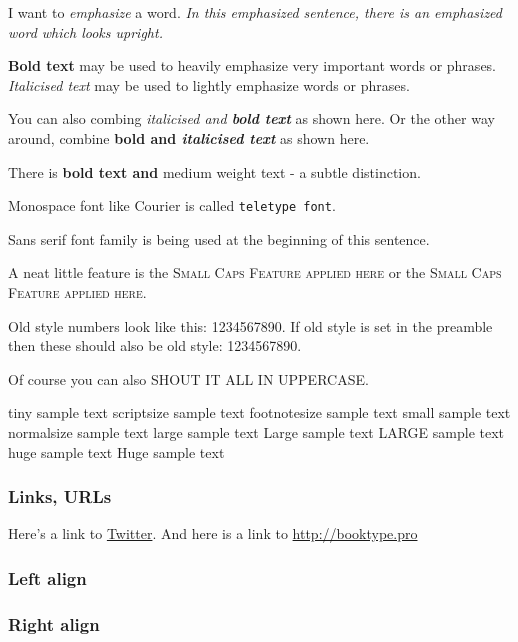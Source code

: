 I want to \emph{emphasize} a word.
\emph{In this emphasized sentence, there is an emphasized \emph{word} which looks upright.}

\textbf{Bold text} may be used to heavily emphasize very important words or phrases.
\textit{Italicised text} may be used to lightly emphasize words or phrases.

You can also combing \textit{italicised and \textbf{bold text}} as shown here.
Or the other way around, combine \textbf{bold and \textit{italicised text}} as shown here.

There is \textbf{bold text and} \textmd{medium weight text} - a subtle distinction.

Monospace font like Courier is called \texttt{teletype font}.

\textsf{Sans serif font family} is being used at the beginning of this sentence.

A neat little feature is the \textsc{Small Caps Feature applied here} or the
{\scshape Small Caps Feature applied here}. 

Old style numbers look like this: {1234567890}. If old style is set in the preamble then these should also be old style: 1234567890.

Of course you can also \uppercase{shout it all in uppercase}.

\tiny{tiny sample text}
\scriptsize{scriptsize sample text}
\footnotesize{footnotesize sample text}
\small{small sample text}
\normalsize{normalsize sample text}
\large{large sample text}
\Large{Large sample text}
\LARGE{LARGE sample text}
\huge{huge sample text}
\Huge{Huge sample text}

\normalsize

\subsubsection{Links, URLs}
Here's a link to \href{http://twitter.com/home}{Twitter}. 
And here is a link to \url{http://booktype.pro}

\subsubsection{Left align}
\begin{flushleft}
\lipsum[1]
\end{flushleft}

\subsubsection{Right align}
\begin{flushright}
\lipsum[1]
\end{flushright}

